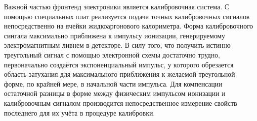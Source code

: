 Важной частью фронтенд электроники является калибровочная система. С помощью специальных плат реализуется подача точных калибровочных сигналов непосредственно на ячейки жидкоаргонового калориметра. Форма калибровочного сингала максимально приближена к импульсу ионизации, генерируемому электромагнитным ливнем в детекторе. В силу того, что получить истинно треугольный сигнал с помощью электронной схемы достаточно трудно, первоначально создаётся экспоненциальный импульс, у которого обрезается область затухания для максимального приближения к желаемой треугольной форме, по крайней мере, в начальной части импульса. Для компенсации остаточной разницы в форме между физическим импульсом ионизации и калибровочным сигналом производится непосредственное измерение свойств последнего для их учёта в процедуре калибровки.\par
